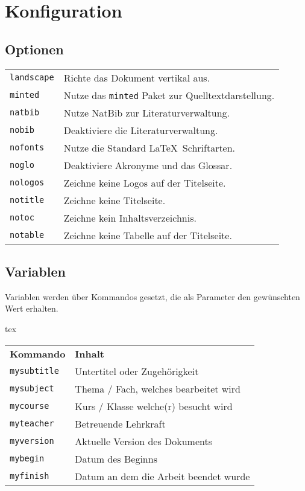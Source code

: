 
\section{Konfiguration}
\subsection{Optionen}
\begin{tabularx}{\textwidth}{l X}
{\small \verb|landscape|}    & Richte das Dokument vertikal aus.\\
{\small \verb|minted|}       & Nutze das \texttt{minted} Paket zur Quelltextdarstellung.\\
{\small \verb|natbib|}       & Nutze NatBib zur Literaturverwaltung.\\
{\small \verb|nobib|}        & Deaktiviere die Literaturverwaltung.\\
{\small \verb|nofonts|}      & Nutze die Standard \LaTeX ~Schriftarten.\\
{\small \verb|noglo|}        & Deaktiviere Akronyme und das Glossar.\\
{\small \verb|nologos|}      & Zeichne keine Logos auf der Titelseite.\\
{\small \verb|notitle|}      & Zeichne keine Titelseite.\\
{\small \verb|notoc|}        & Zeichne kein Inhaltsverzeichnis.\\
{\small \verb|notable|}      & Zeichne keine Tabelle auf der Titelseite.
\end{tabularx}

\subsection{Variablen}
Variablen werden über Kommandos gesetzt, die als Parameter den gewünschten Wert erhalten.
\begin{code}{tex}
\end{code}

\begin{tabular}{l l}
\textbf{Kommando} & \textbf{Inhalt}\\

{\small \verb|mysubtitle|} 	& Untertitel oder Zugehörigkeit\\
{\small \verb|mysubject|} 	& Thema / Fach, welches bearbeitet wird\\
{\small \verb|mycourse|} 	& Kurs / Klasse welche(r) besucht wird\\
{\small \verb|myteacher|} 	& Betreuende Lehrkraft\\
{\small \verb|myversion|} 	& Aktuelle Version des Dokuments\\
{\small \verb|mybegin|} 	& Datum des Beginns\\
{\small \verb|myfinish|} 	& Datum an dem die Arbeit beendet wurde
\end{tabular}

